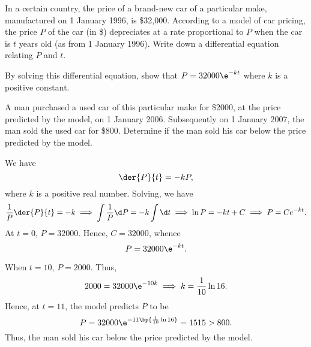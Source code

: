 \begin{problem}
    In a certain country, the price of a brand-new car of a particular make, manufactured on 1 January 1996, is \$32,000. According to a model of car pricing, the price $P$ of the car (in \$) depreciates at a rate proportional to $P$ when the car is $t$ years old (as from 1 January 1996). Write down a differential equation relating $P$ and $t$.
    
    By solving this differential equation, show that $P = 32000\e^{-kt}$ where $k$ is a positive constant.
    
    A man purchased a used car of this particular make for \$2000, at the price predicted by the model, on 1 January 2006. Subsequently on 1 January 2007, the man sold the used car for \$800. Determine if the man sold his car below the price predicted by the model.
\end{problem}
\begin{solution}
    We have \[\der{P}{t} = -k P,\] where $k$ is a positive real number. Solving, we have \[\frac1P \der{P}{t} = -k \implies \int \frac1P \d P = -k \int \d t \implies \ln P = -kt + C \implies P = Ce^{-kt}.\] At $t = 0$, $P = 32000$. Hence, $C = 32000$, whence \[P = 32000\e^{-kt}.\]

    When $t = 10$, $P = 2000$. Thus, \[2000 = 32000 \e^{-10k} \implies k = \frac1{10} \ln 16.\] Hence, at $t = 11$, the model predicts $P$ to be \[P = 32000 \e^{-11 \bp{\frac1{10} \ln 16}} = 1515 > 800.\] Thus, the man sold his car below the price predicted by the model.
\end{solution}